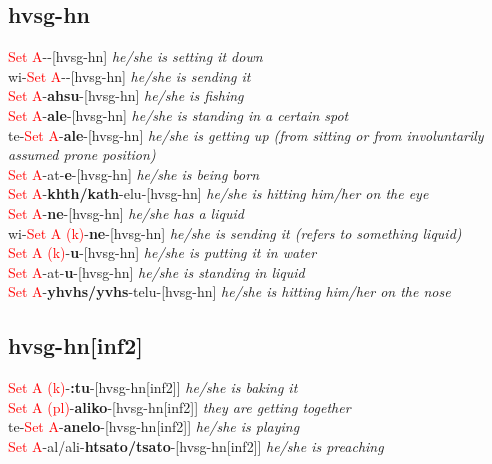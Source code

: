 \documentclass[oneside,openany]{book}%
\begin{document}
\subsection*{hvsg-hn}%
\textcolor{Red}{Set A}{-}\textbf{}{-}[hvsg-hn] \textit{ he/she is setting it down} \\%
wi{-}\textcolor{Red}{Set A}{-}\textbf{}{-}[hvsg-hn] \textit{ he/she is sending it} \\%
\textcolor{Red}{Set A}{-}\textbf{ahsu}{-}[hvsg-hn] \textit{ he/she is fishing} \\%
\textcolor{Red}{Set A}{-}\textbf{ale}{-}[hvsg-hn] \textit{ he/she is standing in a certain spot} \\%
te{-}\textcolor{Red}{Set A}{-}\textbf{ale}{-}[hvsg-hn] \textit{ he/she is getting up (from sitting or from involuntarily assumed prone position)} \\%
\textcolor{Red}{Set A}{-}at{-}\textbf{e}{-}[hvsg-hn] \textit{ he/she is being born} \\%
\textcolor{Red}{Set A}{-}\textbf{khth/kath}{-}elu{-}[hvsg-hn] \textit{ he/she is hitting him/her on the eye} \\%
\textcolor{Red}{Set A}{-}\textbf{ne}{-}[hvsg-hn] \textit{ he/she has a liquid} \\%
wi{-}\textcolor{Red}{Set A (k)}{-}\textbf{ne}{-}[hvsg-hn] \textit{ he/she is sending it (refers to something liquid)} \\%
\textcolor{Red}{Set A (k)}{-}\textbf{u}{-}[hvsg-hn] \textit{ he/she is putting it in water} \\%
\textcolor{Red}{Set A}{-}at{-}\textbf{u}{-}[hvsg-hn] \textit{ he/she is standing in liquid} \\%
\textcolor{Red}{Set A}{-}\textbf{yhvhs/yvhs}{-}telu{-}[hvsg-hn] \textit{ he/she is hitting him/her on the nose} \\%
\vspace{1em}%
\needspace{1in}%
\subsection*{hvsg-hn[inf2]}%
\textcolor{Red}{Set A (k)}{-}\textbf{:tu}{-}[hvsg-hn[inf2]] \textit{ he/she is baking it} \\%
\textcolor{Red}{Set A (pl)}{-}\textbf{aliko}{-}[hvsg-hn[inf2]] \textit{ they are getting together} \\%
te{-}\textcolor{Red}{Set A}{-}\textbf{anelo}{-}[hvsg-hn[inf2]] \textit{ he/she is playing} \\%
\textcolor{Red}{Set A}{-}al/ali{-}\textbf{htsato/tsato}{-}[hvsg-hn[inf2]] \textit{ he/she is preaching} \\%
\vspace{1em}%
\needspace{1in}%
\end{document}
